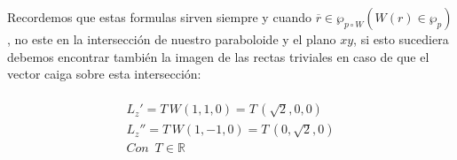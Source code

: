 \documentclass[11pt,letterpaper]{article}
\newcommand{\R}{\mathbb{R}}
\begin{document}
        Recordemos que estas formulas sirven siempre y cuando $\overline{r}\in \wp_{p\circ W}(W(r)\in \wp_{p})$, no este en la intersecci\'on de nuestro paraboloide y el plano $xy$, si esto sucediera debemos encontrar tambi\'en la imagen de las rectas triviales en caso de que el vector caiga sobre esta intersecci\'on:\,\\
        \,\\
        \begin{align*}
            L_z'=T\,W(1,1,0)=T\,(\sqrt{2},0,0)\\
            L_z''=T\,W(1,-1,0)=T\,(0,\sqrt{2},0)\\
            Con\,\,\,T\in \R
        \end{align*}
\end{document}
